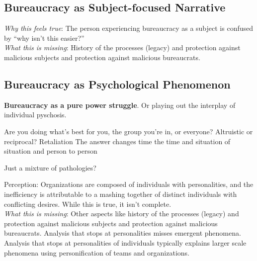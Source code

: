 \subsection{Bureaucracy as Subject-focused Narrative}
\textit{Why this feels true}: The person experiencing bureaucracy as a subject is confused by ``why isn't this easier?''  \\
\textit{What this is missing}: History of the processes (legacy) and protection against malicious subjects and protection against malicious bureaucrats. 


\subsection{Bureaucracy as Psychological Phenomenon}

\textbf{Bureaucracy as a pure power struggle}. Or playing out the interplay of individual pyschosis. 

Are you doing what's best for you, the group you're in, or everyone?
Altruistic or reciprocal? Retaliation
The answer changes time the time and situation of situation and person to person

Just a mixture of pathologies?

Perception: Organizations are composed of individuals with personalities, and the inefficiency is attributable to a mashing together of distinct individuals with conflicting desires.
While this is true, it isn't complete. \\
\textit{What this is missing}: Other aspects like history of the processes (legacy) and protection against malicious subjects and protection against malicious bureaucrats. Analysis that stops at personalities misses emergent phenomena. Analysis that stops at personalities of individuals typically explains larger scale phenomena using personification of teams and organizations. 